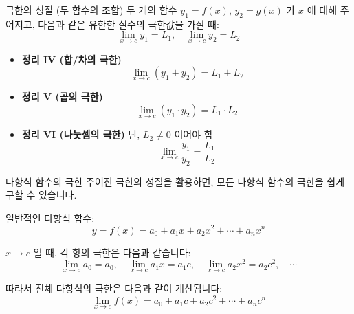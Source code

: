 \documentclass[aspectratio=169]{beamer}
\begin{document}
\begin{frame}{극한의 성질 (두 함수의 조합)}
  두 개의 함수 \( y_1 = f(x) \), \( y_2 = g(x) \) 가 \( x \) 에 대해 주어지고, 다음과 같은 유한한 실수의 극한값을 가질 때:
  \[
    \lim_{x \to c} y_1 = L_1, \quad \lim_{x \to c} y_2 = L_2
  \]
  

  \begin{itemize}
    \item \textbf{정리 IV (합/차의 극한)}
    \[
      \lim_{x \to c} (y_1 \pm y_2) = L_1 \pm L_2
    \]

    

    \item \textbf{정리 V (곱의 극한)}
    \[
      \lim_{x \to c} (y_1 \cdot y_2) = L_1 \cdot L_2
    \]



    \item \textbf{정리 VI (나눗셈의 극한)}  
    단, \( L_2 \ne 0 \) 이어야 함
    \[
      \lim_{x \to c} \frac{y_1}{y_2} = \frac{L_1}{L_2}
    \]
  \end{itemize}
\end{frame}

\begin{frame}{다항식 함수의 극한}
  주어진 극한의 성질을 활용하면, 모든 다항식 함수의 극한을 쉽게 구할 수 있습니다.

  \vspace{0.3cm}
  일반적인 다항식 함수:
  \[
    y = f(x) = a_0 + a_1x + a_2x^2 + \cdots + a_nx^n
  \]

  \( x \to c \) 일 때, 각 항의 극한은 다음과 같습니다:
  \[
    \lim_{x \to c} a_0 = a_0, \quad
    \lim_{x \to c} a_1x = a_1c, \quad
    \lim_{x \to c} a_2x^2 = a_2c^2, \quad \cdots
  \]

  \vspace{0.3cm}
  따라서 전체 다항식의 극한은 다음과 같이 계산됩니다:
  \[
    \lim_{x \to c} f(x) = a_0 + a_1c + a_2c^2 + \cdots + a_nc^n
  \]

\end{frame}
\end{document}
